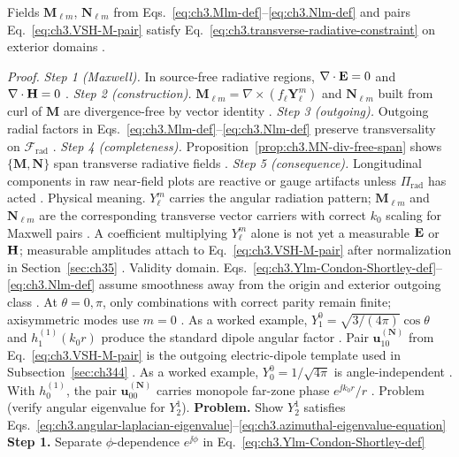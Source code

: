 \begin{theorem}
\label{thm:ch3.vsh-div-free}
Fields \(\mathbf{M}_{\ell m}\), \(\mathbf{N}_{\ell m}\) from Eqs.~\eqref{eq:ch3.Mlm-def}--\eqref{eq:ch3.Nlm-def}
and pairs Eq.~\eqref{eq:ch3.VSH-M-pair} satisfy Eq.~\eqref{eq:ch3.transverse-radiative-constraint} on exterior
domains \cite{stratton1941}.
\end{theorem}
\noindent\textit{Proof.}
\emph{Step 1 (Maxwell).} In source-free radiative regions, \(\nabla\cdot\mathbf{E}=0\) and \(\nabla\cdot\mathbf{H}=0\) .
\emph{Step 2 (construction).} \(\mathbf{M}_{\ell m}=\nabla\times(f_{\ell}\mathbf{Y}_{\ell}^{m})\) and \(\mathbf{N}_{\ell m}\) built from curl of \(\mathbf{M}\) are divergence-free by vector identity .
\emph{Step 3 (outgoing).} Outgoing radial factors in Eqs.~\eqref{eq:ch3.Mlm-def}--\eqref{eq:ch3.Nlm-def} preserve transversality on \(\mathcal{F}_{\mathrm{rad}}\) .
\emph{Step 4 (completeness).} Proposition~\ref{prop:ch3.MN-div-free-span} shows \(\{\mathbf{M},\mathbf{N}\}\) span transverse radiative fields .
\emph{Step 5 (consequence).} Longitudinal components in raw near-field plots are reactive or gauge artifacts unless \(\Pi_{\mathrm{rad}}\) has acted .
Physical meaning. \(Y_{\ell}^{m}\) carries the angular radiation pattern; \(\mathbf{M}_{\ell m}\) and \(\mathbf{N}_{\ell m}\) are
the corresponding transverse vector carriers with correct \(k_{0}\) scaling for Maxwell pairs
. A coefficient multiplying \(Y_{\ell}^{m}\) alone is not yet a measurable
\(\mathbf{E}\) or \(\mathbf{H}\); measurable amplitudes attach to Eq.~\eqref{eq:ch3.VSH-M-pair} after normalization in
Section~\ref{sec:ch35} .
Validity domain. Eqs.~\eqref{eq:ch3.Ylm-Condon-Shortley-def}--\eqref{eq:ch3.Nlm-def} assume smoothness away from the origin and
exterior outgoing class . At \(\theta=0,\pi\), only combinations with correct parity remain
finite; axisymmetric modes use \(m=0\) .
As a worked example, \(Y_{1}^{0}=\sqrt{3/(4\pi)}\cos\theta\) and \(h_{1}^{(1)}(k_{0}r)\) produce the standard dipole angular factor
. Pair \(\mathbf{u}_{10}^{(\mathbf{N})}\) from Eq.~\eqref{eq:ch3.VSH-M-pair} is the
outgoing electric-dipole template used in Subsection~\ref{sec:ch344} .
As a worked example, \(Y_{0}^{0}=1/\sqrt{4\pi}\) is angle-independent . With \(h_{0}^{(1)}\), the pair
\(\mathbf{u}_{00}^{(\mathbf{N})}\) carries monopole far-zone phase \(e^{\jj k_{0}r}/r\) .
Problem (verify angular eigenvalue for \(Y_{2}^{1}\)). \textbf{Problem.} Show \(Y_{2}^{1}\) satisfies Eqs.~\eqref{eq:ch3.angular-laplacian-eigenvalue}--\eqref{eq:ch3.azimuthal-eigenvalue-equation}
\textbf{Step 1.} Separate \(\phi\)-dependence \(e^{\jj\phi}\) in Eq.~\eqref{eq:ch3.Ylm-Condon-Shortley-def}
